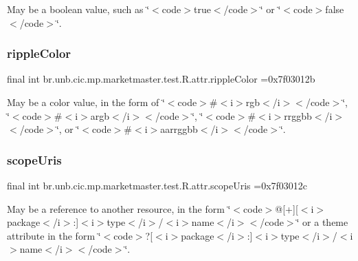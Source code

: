 May be a boolean value, such as \char`\"{}$<$code$>$true$<$/code$>$\char`\"{} or \char`\"{}$<$code$>$false$<$/code$>$\char`\"{}. \mbox{\label{classbr_1_1unb_1_1cic_1_1mp_1_1marketmaster_1_1test_1_1R_1_1attr_ae8bc696de1dc4eb0944b60953f5896c1}} 
\subsubsection{\texorpdfstring{ripple\+Color}{rippleColor}}
{\footnotesize\ttfamily final int br.\+unb.\+cic.\+mp.\+marketmaster.\+test.\+R.\+attr.\+ripple\+Color =0x7f03012b\hspace{0.3cm}{\ttfamily [static]}}

May be a color value, in the form of \char`\"{}$<$code$>$\#$<$i$>$rgb$<$/i$>$$<$/code$>$\char`\"{}, \char`\"{}$<$code$>$\#$<$i$>$argb$<$/i$>$$<$/code$>$\char`\"{}, \char`\"{}$<$code$>$\#$<$i$>$rrggbb$<$/i$>$$<$/code$>$\char`\"{}, or \char`\"{}$<$code$>$\#$<$i$>$aarrggbb$<$/i$>$$<$/code$>$\char`\"{}. \mbox{\label{classbr_1_1unb_1_1cic_1_1mp_1_1marketmaster_1_1test_1_1R_1_1attr_a614abcbb3da1be4a7c65f3ec51fb0e4a}} 
\subsubsection{\texorpdfstring{scope\+Uris}{scopeUris}}
{\footnotesize\ttfamily final int br.\+unb.\+cic.\+mp.\+marketmaster.\+test.\+R.\+attr.\+scope\+Uris =0x7f03012c\hspace{0.3cm}{\ttfamily [static]}}

May be a reference to another resource, in the form \char`\"{}$<$code$>$@\mbox{[}+\mbox{]}\mbox{[}$<$i$>$package$<$/i$>$\+:\mbox{]}$<$i$>$type$<$/i$>$/$<$i$>$name$<$/i$>$$<$/code$>$\char`\"{} or a theme attribute in the form \char`\"{}$<$code$>$?\mbox{[}$<$i$>$package$<$/i$>$\+:\mbox{]}$<$i$>$type$<$/i$>$/$<$i$>$name$<$/i$>$$<$/code$>$\char`\"{}. 

